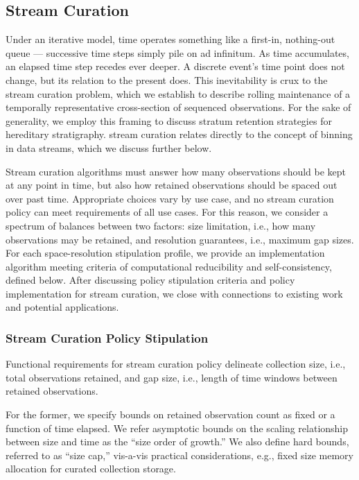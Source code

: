 \subsection{Stream Curation} \label{sec:streaming-curation}

Under an iterative model, time operates something like a first-in, nothing-out queue --- successive time steps simply pile on ad infinitum.
As time accumulates, an elapsed time step recedes ever deeper.
A discrete event's time point does not change, but its relation to the present does.  %
This inevitability is crux to the stream curation problem, which we establish to describe rolling maintenance of a temporally representative cross-section of sequenced observations.
For the sake of generality, we employ this framing to discuss stratum retention strategies for hereditary stratigraphy.
stream curation relates directly to the concept of binning in data streams, which we discuss further below.

Stream curation algorithms must answer how many observations should be kept at any point in time, but also how retained observations should be spaced out over past time.
Appropriate choices vary by use case, and no stream curation policy can meet requirements of all use cases.
For this reason, we consider a spectrum of balances between two factors: size limitation, i.e., how many observations may be retained, and resolution guarantees, i.e., maximum gap sizes.
For each space-resolution stipulation profile, we provide an implementation algorithm meeting criteria of computational reducibility and self-consistency, defined below.
After discussing policy stipulation criteria and policy implementation for stream curation, we close with connections to existing work and potential applications.

\subsubsection{Stream Curation Policy Stipulation}

Functional requirements for stream curation policy delineate collection size, i.e., total observations retained, and gap size, i.e., length of time windows between retained observations.

For the former, we specify bounds on retained observation count as fixed or a function of time elapsed.
We refer asymptotic bounds on the scaling relationship between size and time as  the ``size order of growth.''
We also define hard bounds, referred to as ``size cap,'' vis-a-vis practical considerations, e.g., fixed size memory allocation for curated collection storage.

